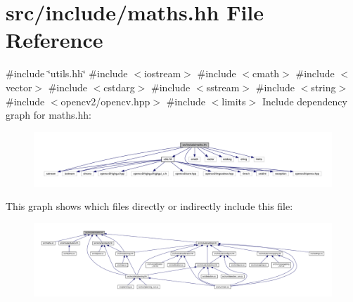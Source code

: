 \hypertarget{maths_8hh}{}\section{src/include/maths.hh File Reference}
\label{maths_8hh}
{\ttfamily \#include \char`\"{}utils.\+hh\char`\"{}}\newline
{\ttfamily \#include $<$iostream$>$}\newline
{\ttfamily \#include $<$cmath$>$}\newline
{\ttfamily \#include $<$vector$>$}\newline
{\ttfamily \#include $<$cstdarg$>$}\newline
{\ttfamily \#include $<$sstream$>$}\newline
{\ttfamily \#include $<$string$>$}\newline
{\ttfamily \#include $<$opencv2/opencv.\+hpp$>$}\newline
{\ttfamily \#include $<$limits$>$}\newline
Include dependency graph for maths.\+hh\+:
\nopagebreak
\begin{figure}[H]
\begin{center}
\leavevmode
\includegraphics[width=350pt]{maths_8hh__incl}
\end{center}
\end{figure}
This graph shows which files directly or indirectly include this file\+:
\nopagebreak
\begin{figure}[H]
\begin{center}
\leavevmode
\includegraphics[width=350pt]{maths_8hh__dep__incl}
\end{center}
\end{figure}
